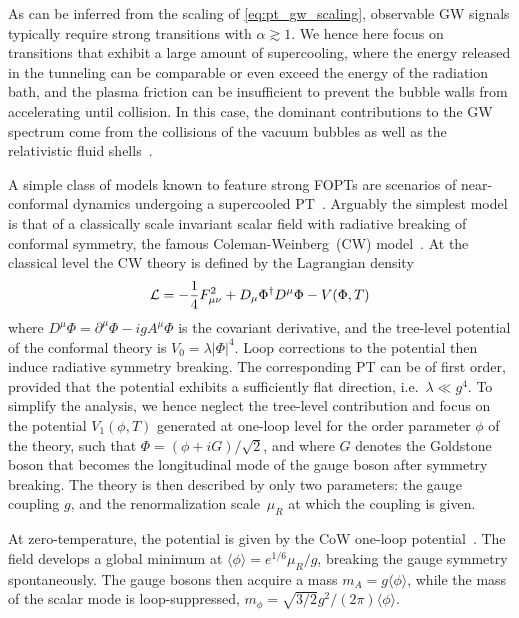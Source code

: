 \documentclass{article}
\begin{document}
As can be inferred from the scaling of \cref{eq:pt_gw_scaling}, observable GW signals typically require strong transitions with $\alpha \gtrsim 1$.
We hence here focus on transitions that exhibit a large amount of supercooling, where the energy released in the tunneling can be comparable or even exceed the energy of the radiation bath, and the plasma friction can be insufficient to prevent the bubble walls from accelerating until collision. 
In this case, the dominant contributions to the GW spectrum come from the collisions of the vacuum bubbles as well as the relativistic fluid shells~\cite{Lewicki:2022pdb}.

\bigskip 

A simple class of models known to feature strong FOPTs are scenarios of near-conformal dynamics undergoing a supercooled PT~\cite{Jinno:2016knw,Iso:2017uuu,Levi:2022bzt,Marzola:2017jzl,Azatov:2019png,Borah:2021ftr,Kierkla:2022odc,Freese:2022qrl,Sagunski:2023ynd}. Arguably the simplest model is that of a classically scale invariant scalar field with radiative breaking of conformal symmetry, the famous Coleman-Weinberg~(CW) model~\cite{Coleman:1973jx}.
At the classical level the CW theory is defined by the Lagrangian density
%
\begin{equation}
    {\cal L} = -\frac{1}{4}F^2_{\mu\nu}+D_{\mu}\Phi^\dagger D^{\mu}\Phi - V(\Phi,T)
\end{equation}
where $D^{\mu}\Phi=\partial^\mu\Phi-igA^\mu \Phi$ is the covariant derivative, and the tree-level potential of the conformal theory is $V_0 = \lambda |\Phi|^4$.
Loop corrections to the potential then induce radiative symmetry breaking.
The corresponding PT can be of first order, provided that the potential exhibits a sufficiently flat direction, i.e.\ $\lambda \ll g^4$.
To simplify the analysis, we hence neglect the tree-level contribution and focus on the potential $V_1(\phi,T)$ generated at one-loop level for the order parameter $\phi$ of the theory, such that $\Phi = (\phi + i G )/\sqrt{2}$, and where $G$ denotes the Goldstone boson that becomes the longitudinal mode of the gauge boson after symmetry breaking. 
The theory is then described by only two parameters: the gauge coupling $g$, and the renormalization scale~$\mu_R$ at which the coupling is given.

At zero-temperature, the potential is given by the CoW one-loop potential~\cite{Coleman:1973jx}. 
The field develops a global minimum at $\langle\phi\rangle= e^{1/6} \mu_R/g$, breaking the gauge symmetry spontaneously.
The gauge bosons then acquire a mass $m_A = g \langle\phi\rangle$, while the mass of the scalar mode is loop-suppressed, $m_\phi = \sqrt{3/2} g^2 / (2\pi) \langle\phi\rangle$.
\end{document}
